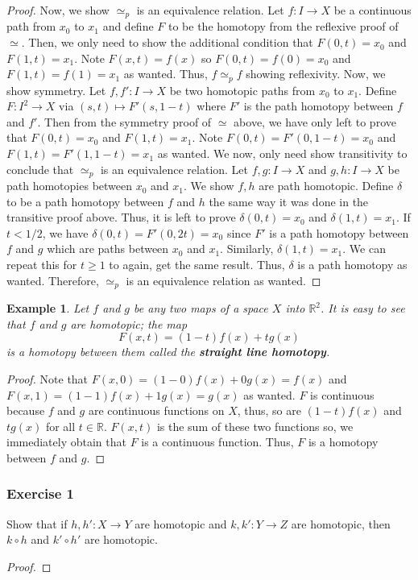 \documentclass{article}
\newtheorem{example}[theorem]{Example}
\begin{document}
\begin{proof}
	Now, we show $\simeq_p$ is an equivalence relation. Let $f: I\to X$ be a continuous path from $x_0$ to $x_1$ and define $F$ to be the homotopy from the reflexive 
	proof of $\simeq$. Then, we only need to show the additional condition that $F(0,t) = x_0$ and $F(1,t) = x_1$. Note $F(x,t) = f(x)$ so $F(0,t) = f(0) = x_0$ and $F(1,t)=f(1)=x_1$
	as wanted. Thus, $f\simeq_p f$ showing reflexivity. Now, we show symmetry. Let $f,f':I\to X$ be two homotopic paths from $x_0$ to $x_1$. Define $F:I^2 \to X$ via
	$(s,t)\mapsto F'(s,1-t)$ where $F'$ is the path homotopy between $f$ and $f'$. Then from the symmetry proof of $\simeq$ above, we have only left to prove that
	$F(0,t) = x_0$ and $F(1,t) = x_1$. Note $F(0,t) = F'(0,1-t) = x_0$ and $F(1,t) = F'(1,1-t) = x_1$ as wanted. We now, only need show transitivity to conclude that $\simeq_p$ is
	an equivalence relation. Let $f,g:I\to X$ and $g,h:I\to X$ be path homotopies between $x_0$ and $x_1$. We show $f,h$ are path homotopic. Define $\delta$ to be a path
	homotopy between $f$ and $h$ the same way it was done in the transitive proof above. Thus, it is left to prove $\delta(0,t) = x_0$ and $\delta(1,t) = x_1$.
	If $t<1/2$, we have $\delta(0,t) = F'(0,2t) = x_0$ since $F'$ is a path homotopy between $f$ and $g$ which are paths between $x_0$ and $x_1$. Similarly, $\delta(1,t) = x_1$.
	We can repeat this for $t\geq 1$ to again, get the same result. Thus, $\delta$ is a path homotopy as wanted. Therefore, $\simeq_p$ is an equivalence relation as wanted.
\end{proof}

\begin{example}
	Let $f$ and $g$ be any two maps of a space $X$ into $\mathbb{R}^2$. It is easy to see that $f$ and $g$ are homotopic; the map
	\[ F(x,t) = (1-t)f(x) + tg(x) \]
	is a homotopy between them called the \textbf{straight line homotopy}.
\end{example}
\begin{proof}
	Note that $F(x,0) = (1-0)f(x) + 0g(x) = f(x)$ and $F(x,1) = (1-1)f(x) + 1g(x) = g(x)$ as wanted. $F$ is continuous because $f$ and $g$ are continuous functions on $X$, thus,
	so are $(1-t)f(x)$ and $tg(x)$ for all $t\in\mathbb{R}$. $F(x,t)$ is the sum of these two functions so, we immediately obtain that $F$ is a continuous function. Thus, $F$ is a homotopy
	between $f$ and $g$. 
\end{proof}

\subsubsection*{Exercise 1}

Show that if $h,h':X\to Y$ are homotopic and $k,k':Y\to Z$ are homotopic, then $k\circ h$ and $k'\circ h'$ are homotopic.
\begin{proof}
\end{proof}
\end{document}

